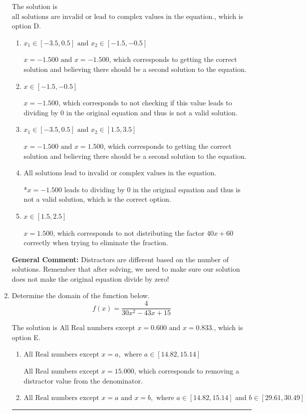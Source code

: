 \documentclass{extbook}[14pt]
\newcommand{\litem}[1]{\item #1

\rule{\textwidth}{0.4pt}}
\begin{document}
\begin{enumerate}
{The solution is \( \text{all solutions are invalid or lead to complex values in the equation.} \), which is option D.\begin{enumerate}[label=\Alph*.]
\item \( x_1 \in [-3.5, 0.5] \text{ and } x_2 \in [-1.5,-0.5] \)

$x = -1.500 \text{ and } x = -1.500$, which corresponds to getting the correct solution and believing there should be a second solution to the equation.
\item \( x \in [-1.5,-0.5] \)

$x = -1.500$, which corresponds to not checking if this value leads to dividing by 0 in the original equation and thus is not a valid solution.
\item \( x_1 \in [-3.5, 0.5] \text{ and } x_2 \in [1.5,3.5] \)

$x = -1.500 \text{ and } x = 1.500$, which corresponds to getting the correct solution and believing there should be a second solution to the equation.
\item \( \text{All solutions lead to invalid or complex values in the equation.} \)

*$x = -1.500$ leads to dividing by 0 in the original equation and thus is not a valid solution, which is the correct option.
\item \( x \in [1.5,2.5] \)

$x = 1.500$, which corresponds to not distributing the factor $40x + 60$ correctly when trying to eliminate the fraction.
\end{enumerate}

\textbf{General Comment:} Distractors are different based on the number of solutions. Remember that after solving, we need to make sure our solution does not make the original equation divide by zero!
}
\litem{
Determine the domain of the function below.
\[ f(x) = \frac{4}{30x^{2} -43 x + 15} \]

The solution is \( \text{All Real numbers except } x = 0.600 \text{ and } x = 0.833. \), which is option E.\begin{enumerate}[label=\Alph*.]
\item \( \text{All Real numbers except } x = a, \text{ where } a \in [14.82, 15.14] \)

All Real numbers except $x = 15.000$, which corresponds to removing a distractor value from the denominator.
\item \( \text{All Real numbers except } x = a \text{ and } x = b, \text{ where } a \in [14.82, 15.14] \text{ and } b \in [29.61, 30.49] \)


\end{enumerate}}
\end{enumerate}
\end{document}
